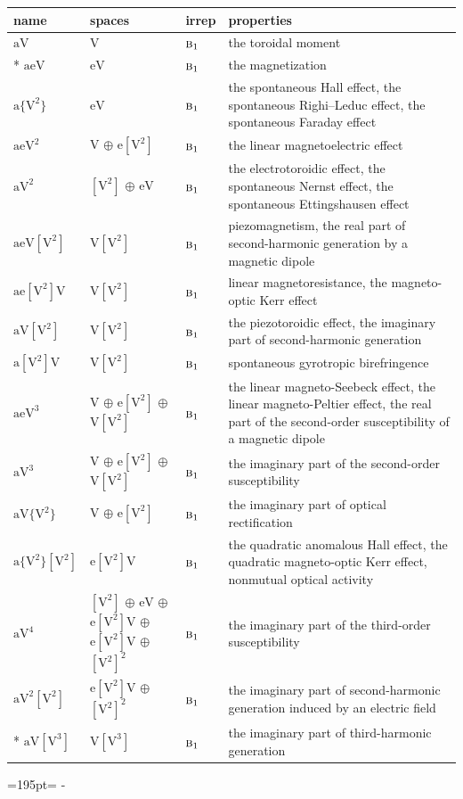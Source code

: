 \documentclass[10pt,a4paper]{article}
\newcommand{\needspace}[1]{\par\penalty-100\begingroup\dimen0=#1\relax\dimen2=\pagegoal
  \advance\dimen2-\pagetotal\ifdim\dimen0>\dimen2\relax\ifdim\dimen2>0pt\vfil\break\fi\fi
  \endgroup}
\numberwithin{equation}{section}
\newcommand{\irr}[1]{\text{\normalfont\scshape #1}}
\newcommand{\jahn}[1]{\mathrm{#1}}
\newlength{\fillwidth}\newlength{\cellwidth}\newlength{\colwidth}
\begin{document}
{\begin{longtable}{@{}lll>{\RaggedRight\arraybackslash}p{\fillwidth}@{}}
name & spaces & irrep & properties\\\midrule\endhead
\bottomrule\endfoot\endlastfoot
$\jahn{aV}$ & $\jahn{V}$ & $\irr{b}_{1}$ & the toroidal moment\\*
$\jahn{aeV}$ & $\jahn{eV}$ & $\irr{b}_{1}$ & the magnetization\\
$\jahn{a\{V^{2}\}}$ & $\jahn{eV}$ & $\irr{b}_{1}$ & the spontaneous Hall effect, the spontaneous Righi–Leduc effect, the spontaneous Faraday effect\\
$\jahn{aeV^{2}}$ & $\jahn{V}$ $\oplus$ $\jahn{e[V^{2}]}$ & $\irr{b}_{1}$ & the linear magnetoelectric effect\\
$\jahn{aV^{2}}$ & $\jahn{[V^{2}]}$ $\oplus$ $\jahn{eV}$ & $\irr{b}_{1}$ & the electrotoroidic effect, the spontaneous Nernst effect, the spontaneous Ettingshausen effect\\
$\jahn{aeV[V^{2}]}$ & $\jahn{V[V^{2}]}$ & $\irr{b}_{1}$ & piezomagnetism, the real part of second-harmonic generation by a magnetic dipole\\
$\jahn{ae[V^{2}]V}$ & $\jahn{V[V^{2}]}$ & $\irr{b}_{1}$ & linear magnetoresistance, the magneto-optic Kerr effect\\
$\jahn{aV[V^{2}]}$ & $\jahn{V[V^{2}]}$ & $\irr{b}_{1}$ & the piezotoroidic effect, the imaginary part of second-harmonic generation\\
$\jahn{a[V^{2}]V}$ & $\jahn{V[V^{2}]}$ & $\irr{b}_{1}$ & spontaneous gyrotropic birefringence\\
$\jahn{aeV^{3}}$ & $\jahn{V}$ $\oplus$ $\jahn{e[V^{2}]}$ $\oplus$ $\jahn{V[V^{2}]}$ & $\irr{b}_{1}$ & the linear magneto-Seebeck effect, the linear magneto-Peltier effect, the real part of the second-order susceptibility of a magnetic dipole\\
$\jahn{aV^{3}}$ & $\jahn{V}$ $\oplus$ $\jahn{e[V^{2}]}$ $\oplus$ $\jahn{V[V^{2}]}$ & $\irr{b}_{1}$ & the imaginary part of the second-order susceptibility\\
$\jahn{aV\{V^{2}\}}$ & $\jahn{V}$ $\oplus$ $\jahn{e[V^{2}]}$ & $\irr{b}_{1}$ & the imaginary part of optical rectification\\
$\jahn{a\{V^{2}\}[V^{2}]}$ & $\jahn{e[V^{2}]V}$ & $\irr{b}_{1}$ & the quadratic anomalous Hall effect, the quadratic magneto-optic Kerr effect, nonmutual optical activity\\
$\jahn{aV^{4}}$ & $\jahn{[V^{2}]}$ $\oplus$ $\jahn{eV}$ $\oplus$ $\jahn{e[V^{2}]V}$ $\oplus$ $\jahn{e[V^{2}]V}$ $\oplus$ $\jahn{[V^{2}]^{2}}$ & $\irr{b}_{1}$ & the imaginary part of the third-order susceptibility\\
$\jahn{aV^{2}[V^{2}]}$ & $\jahn{e[V^{2}]V}$ $\oplus$ $\jahn{[V^{2}]^{2}}$ & $\irr{b}_{1}$ & the imaginary part of second-harmonic generation induced by an electric field\\*
$\jahn{aV[V^{3}]}$ & $\jahn{V[V^{3}]}$ & $\irr{b}_{1}$ & the imaginary part of third-harmonic generation\\
\bottomrule\end{longtable}}
\needspace{195pt}
\end{document}
